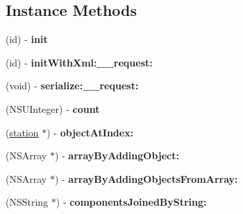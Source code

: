 \subsection*{Instance Methods}
\begin{DoxyCompactItemize}
\item 
\hypertarget{interfaceget_stations_response_aa02cb058970bb982b5f37163f2fa4a05}{}(id) -\/ {\bfseries init}\label{interfaceget_stations_response_aa02cb058970bb982b5f37163f2fa4a05}

\item 
\hypertarget{interfaceget_stations_response_a5d682d41a22af85c276e4728117dd8c2}{}(id) -\/ {\bfseries init\+With\+Xml\+:\+\_\+\+\_\+request\+:}\label{interfaceget_stations_response_a5d682d41a22af85c276e4728117dd8c2}

\item 
\hypertarget{interfaceget_stations_response_aaca08fd83888682d3a7db77d554c6d16}{}(void) -\/ {\bfseries serialize\+:\+\_\+\+\_\+request\+:}\label{interfaceget_stations_response_aaca08fd83888682d3a7db77d554c6d16}

\item 
\hypertarget{interfaceget_stations_response_ad2408df8ee9d80ac2521a7c6f827ea05}{}(N\+S\+U\+Integer) -\/ {\bfseries count}\label{interfaceget_stations_response_ad2408df8ee9d80ac2521a7c6f827ea05}

\item 
\hypertarget{interfaceget_stations_response_aa5b97279defbe17851bc28da9aee1e6d}{}(\hyperlink{interfacestation}{station} $\ast$) -\/ {\bfseries object\+At\+Index\+:}\label{interfaceget_stations_response_aa5b97279defbe17851bc28da9aee1e6d}

\item 
\hypertarget{interfaceget_stations_response_ac3410745fa90c9bee9004ba8b0277a9f}{}(N\+S\+Array $\ast$) -\/ {\bfseries array\+By\+Adding\+Object\+:}\label{interfaceget_stations_response_ac3410745fa90c9bee9004ba8b0277a9f}

\item 
\hypertarget{interfaceget_stations_response_a11932096a902c50bb9e5db6ad85c172b}{}(N\+S\+Array $\ast$) -\/ {\bfseries array\+By\+Adding\+Objects\+From\+Array\+:}\label{interfaceget_stations_response_a11932096a902c50bb9e5db6ad85c172b}

\item 
\hypertarget{interfaceget_stations_response_a8e57f55e9e269c25beadca7289559415}{}(N\+S\+String $\ast$) -\/ {\bfseries components\+Joined\+By\+String\+:}\label{interfaceget_stations_response_a8e57f55e9e269c25beadca7289559415}


\end{DoxyCompactItemize}
